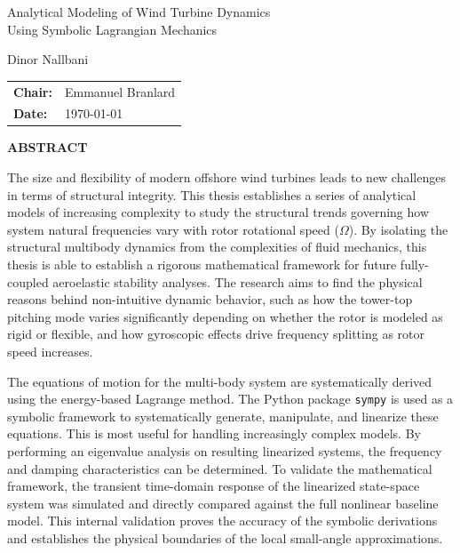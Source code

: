 \documentclass[final,onecolumn]{IEEEtran}
\begin{document}
\begin{titlepage}
    \centering
    \vspace*{1in} %

    {\huge{Analytical Modeling of Wind Turbine Dynamics\\[0.5em] Using Symbolic Lagrangian Mechanics}}\par

    \vspace{2em}

    {\Large Dinor Nallbani}\par

    \vfill

    \begin{tabular}{ l l }
        \textbf{Chair:} & Emmanuel Branlard \\
        \textbf{Date:}  & \today
    \end{tabular}

    \vfill
\end{titlepage}

\newpage
\begin{center}
    \textbf{ABSTRACT}
\end{center}
\vspace{1em}

\noindent
The size and flexibility of modern offshore wind turbines leads to new challenges in terms of structural integrity. This thesis establishes a series of analytical models of increasing complexity to study the structural trends governing how system natural frequencies vary with rotor rotational speed ($\Omega$). By isolating the structural multibody dynamics from the complexities of fluid mechanics, this thesis is able to establish a rigorous mathematical framework for future fully-coupled aeroelastic stability analyses. The research aims to find the physical reasons behind non-intuitive dynamic behavior, such as how the tower-top pitching mode varies significantly depending on whether the rotor is modeled as rigid or flexible, and how gyroscopic effects drive frequency splitting as rotor speed increases.

The equations of motion for the multi-body system are systematically derived using the energy-based Lagrange method. The Python package \texttt{sympy} is used as a symbolic framework to systematically generate, manipulate, and linearize these equations. This is most useful for handling increasingly complex models. By performing an eigenvalue analysis on resulting linearized systems, the frequency and damping characteristics can be determined. To validate the mathematical framework, the transient time-domain response of the linearized state-space system was simulated and directly compared against the full nonlinear baseline model. This internal validation proves the accuracy of the symbolic derivations and establishes the physical boundaries of the local small-angle approximations.
\end{document}
